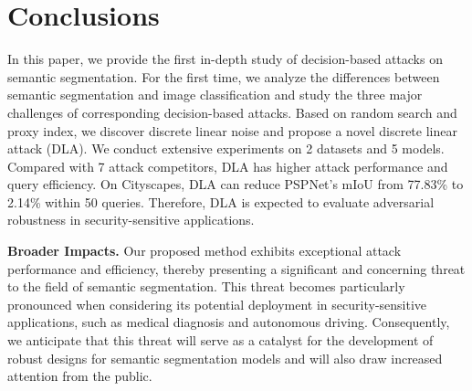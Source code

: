 \documentclass[10pt,twocolumn,letterpaper]{article}
\begin{document}
\section{Conclusions}
In this paper, we provide the first in-depth study of decision-based attacks on semantic segmentation. For the first time, we analyze the differences between semantic segmentation and image classification and study the three major challenges of corresponding decision-based attacks. Based on random search and proxy index, we discover discrete linear noise and propose a novel discrete linear attack (DLA). We conduct extensive experiments on 2 datasets and 5 models. Compared with 7 attack competitors, DLA has higher attack performance and query efficiency. On Cityscapes, DLA can reduce PSPNet’s mIoU from 77.83\% to 2.14\% within 50 queries. Therefore, DLA is expected to evaluate adversarial robustness in security-sensitive applications.

\noindent\textbf{Broader Impacts.} Our proposed method exhibits exceptional attack performance and efficiency, thereby presenting a significant and concerning threat to the field of semantic segmentation. This threat becomes particularly pronounced when considering its potential deployment in security-sensitive applications, such as medical diagnosis and autonomous driving. Consequently, we anticipate that this threat will serve as a catalyst for the development of robust designs for semantic segmentation models and will also draw increased attention from the public.

{
    \small
    
    
}

% 
\end{document}
